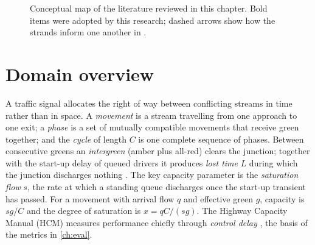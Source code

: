 \begin{figure}[htbp]
{}
  \caption{Conceptual map of the literature reviewed in this chapter. Bold items were adopted by this research;
  dashed arrows show how the strands inform one another in \prism{}.}
  \label{fig:lit-conceptmap}
\end{figure}

\section{Domain overview}\label{sec:lit-domain}
A traffic signal allocates the right of way between conflicting streams in time rather than in space. A
\emph{movement} is a stream travelling from one approach to one exit; a \emph{phase} is a set of mutually
compatible movements that receive green together; and the \emph{cycle} of length $C$ is one complete sequence
of phases. Between consecutive greens an \emph{intergreen} (amber plus all-red) clears the junction; together
with the start-up delay of queued drivers it produces \emph{lost time} $L$ during which the junction discharges
nothing \cite{koonce2008timing}. The key capacity parameter is the \emph{saturation flow} $s$, the rate at which
a standing queue discharges once the start-up transient has passed. For a movement with arrival flow $q$ and
effective green $g$, capacity is $sg/C$ and the degree of saturation is $x=qC/(sg)$. The Highway Capacity
Manual (HCM) measures performance chiefly through \emph{control delay} \cite{hcm2016}, the basis of the metrics
in \cref{ch:eval}.

